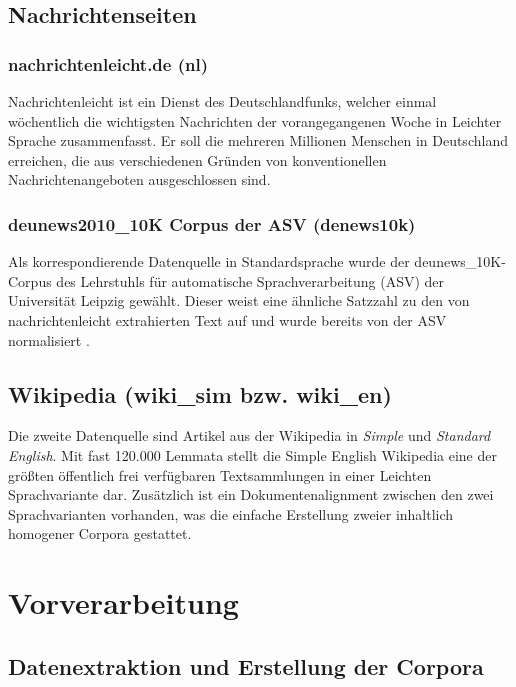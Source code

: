 \documentclass[11pt, a4paper]{article}
\begin{document}
\subsection{Nachrichtenseiten}
\label{nrseiten}

\subsubsection{nachrichtenleicht.de (nl)}

Nachrichtenleicht ist ein Dienst des Deutschlandfunks, welcher einmal
w\"ochentlich die wichtigsten Nachrichten der vorangegangenen Woche in Leichter
Sprache zusammenfasst. Er soll die mehreren Millionen Menschen in Deutschland
erreichen, die aus verschiedenen Gr\"unden von konventionellen
Nachrichtenangeboten ausgeschlossen sind.

\subsubsection{deunews2010\_10K Corpus der ASV (denews10k)}

Als korrespondierende Datenquelle in Standardsprache wurde der
deunews\_10K-Corpus des Lehrstuhls f\"ur automatische Sprachverarbeitung
(ASV) der Universit\"at Leipzig gew\"ahlt. Dieser weist eine \"ahnliche Satzzahl
zu den von nachrichtenleicht extrahierten Text auf und wurde bereits von der ASV
normalisiert \cite{Quasthoff2006}.

\subsection{Wikipedia (wiki\_sim bzw. wiki\_en)}
\label{corp-wiki}
Die zweite Datenquelle sind Artikel aus der Wikipedia in \emph{Simple} und
\emph{Standard English}. Mit fast 120.000 Lemmata stellt die Simple English
Wikipedia eine der gr\"o\ss{}ten \"offentlich frei verf\"ugbaren Textsammlungen
in einer Leichten Sprachvariante dar.
Zus\"atzlich ist ein Dokumentenalignment zwischen den zwei Sprachvarianten
vorhanden, was die einfache Erstellung zweier inhaltlich homogener Corpora
gestattet.


\section{Vorverarbeitung}

\subsection{Datenextraktion und Erstellung der Corpora}
\label{datextr}
\end{document}
